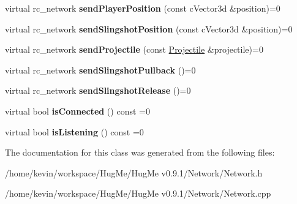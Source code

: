 \begin{DoxyCompactItemize}
\item 
\hypertarget{classNetwork_a9a2eb94c34d8d93f7490184cd2526e62}{
virtual rc\_\-network {\bfseries sendPlayerPosition} (const cVector3d \&position)=0}
\label{classNetwork_a9a2eb94c34d8d93f7490184cd2526e62}

\item 
\hypertarget{classNetwork_aa105332ed8a1325a89f1f3e0a9d27521}{
virtual rc\_\-network {\bfseries sendSlingshotPosition} (const cVector3d \&position)=0}
\label{classNetwork_aa105332ed8a1325a89f1f3e0a9d27521}

\item 
\hypertarget{classNetwork_a477324500341f146fc7fc7411290a424}{
virtual rc\_\-network {\bfseries sendProjectile} (const \hyperlink{classProjectile}{Projectile} \&projectile)=0}
\label{classNetwork_a477324500341f146fc7fc7411290a424}

\item 
\hypertarget{classNetwork_ad4fd766e5bae5a3f002a26218b60b426}{
virtual rc\_\-network {\bfseries sendSlingshotPullback} ()=0}
\label{classNetwork_ad4fd766e5bae5a3f002a26218b60b426}

\item 
\hypertarget{classNetwork_ad78d42da064c3a74151fee25a2bd9044}{
virtual rc\_\-network {\bfseries sendSlingshotRelease} ()=0}
\label{classNetwork_ad78d42da064c3a74151fee25a2bd9044}

\item 
\hypertarget{classNetwork_ab84ebbf03390c5ee99a27e2b340e3518}{
virtual bool {\bfseries isConnected} () const =0}
\label{classNetwork_ab84ebbf03390c5ee99a27e2b340e3518}

\item 
\hypertarget{classNetwork_a1e8342d061f8e1b28d50d966e946650b}{
virtual bool {\bfseries isListening} () const =0}
\label{classNetwork_a1e8342d061f8e1b28d50d966e946650b}

\end{DoxyCompactItemize}


The documentation for this class was generated from the following files:\begin{DoxyCompactItemize}
\item 
/home/kevin/workspace/HugMe/HugMe v0.9.1/Network/Network.h\item 
/home/kevin/workspace/HugMe/HugMe v0.9.1/Network/Network.cpp\end{DoxyCompactItemize}
